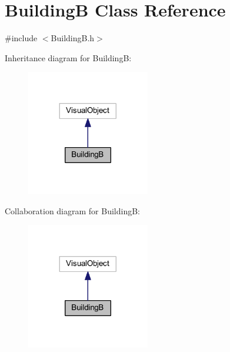 \hypertarget{class_building_b}{}\section{BuildingB Class Reference}
\label{class_building_b}


{\ttfamily \#include $<$Building\+B.\+h$>$}



Inheritance diagram for BuildingB\+:
\nopagebreak
\begin{figure}[H]
\begin{center}
\leavevmode
\includegraphics[width=152pt]{class_building_b__inherit__graph}
\end{center}
\end{figure}


Collaboration diagram for BuildingB\+:
\nopagebreak
\begin{figure}[H]
\begin{center}
\leavevmode
\includegraphics[width=152pt]{class_building_b__coll__graph}
\end{center}
\end{figure}
